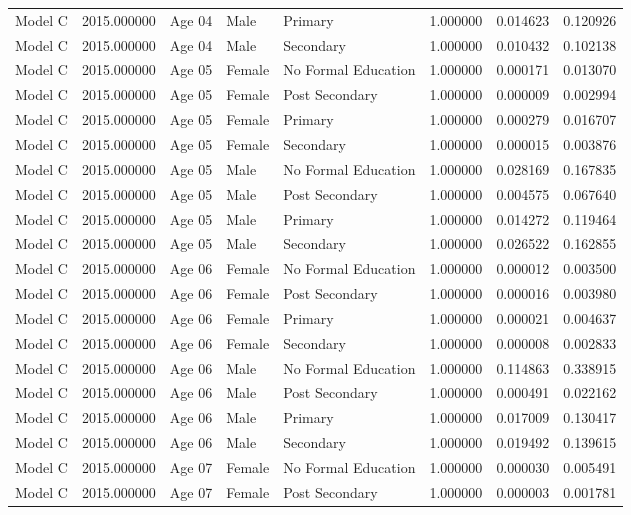 \begin{table}[ht]
\begin{tabular}{lrlllrrr}
Model C & 2015.000000 & Age 04 & Male & Primary & 1.000000 & 0.014623 & 0.120926 \\
Model C & 2015.000000 & Age 04 & Male & Secondary & 1.000000 & 0.010432 & 0.102138 \\
Model C & 2015.000000 & Age 05 & Female & No Formal Education & 1.000000 & 0.000171 & 0.013070 \\
Model C & 2015.000000 & Age 05 & Female & Post Secondary & 1.000000 & 0.000009 & 0.002994 \\
Model C & 2015.000000 & Age 05 & Female & Primary & 1.000000 & 0.000279 & 0.016707 \\
Model C & 2015.000000 & Age 05 & Female & Secondary & 1.000000 & 0.000015 & 0.003876 \\
Model C & 2015.000000 & Age 05 & Male & No Formal Education & 1.000000 & 0.028169 & 0.167835 \\
Model C & 2015.000000 & Age 05 & Male & Post Secondary & 1.000000 & 0.004575 & 0.067640 \\
Model C & 2015.000000 & Age 05 & Male & Primary & 1.000000 & 0.014272 & 0.119464 \\
Model C & 2015.000000 & Age 05 & Male & Secondary & 1.000000 & 0.026522 & 0.162855 \\
Model C & 2015.000000 & Age 06 & Female & No Formal Education & 1.000000 & 0.000012 & 0.003500 \\
Model C & 2015.000000 & Age 06 & Female & Post Secondary & 1.000000 & 0.000016 & 0.003980 \\
Model C & 2015.000000 & Age 06 & Female & Primary & 1.000000 & 0.000021 & 0.004637 \\
Model C & 2015.000000 & Age 06 & Female & Secondary & 1.000000 & 0.000008 & 0.002833 \\
Model C & 2015.000000 & Age 06 & Male & No Formal Education & 1.000000 & 0.114863 & 0.338915 \\
Model C & 2015.000000 & Age 06 & Male & Post Secondary & 1.000000 & 0.000491 & 0.022162 \\
Model C & 2015.000000 & Age 06 & Male & Primary & 1.000000 & 0.017009 & 0.130417 \\
Model C & 2015.000000 & Age 06 & Male & Secondary & 1.000000 & 0.019492 & 0.139615 \\
Model C & 2015.000000 & Age 07 & Female & No Formal Education & 1.000000 & 0.000030 & 0.005491 \\
Model C & 2015.000000 & Age 07 & Female & Post Secondary & 1.000000 & 0.000003 & 0.001781 \\

\end{tabular}
\end{table}
